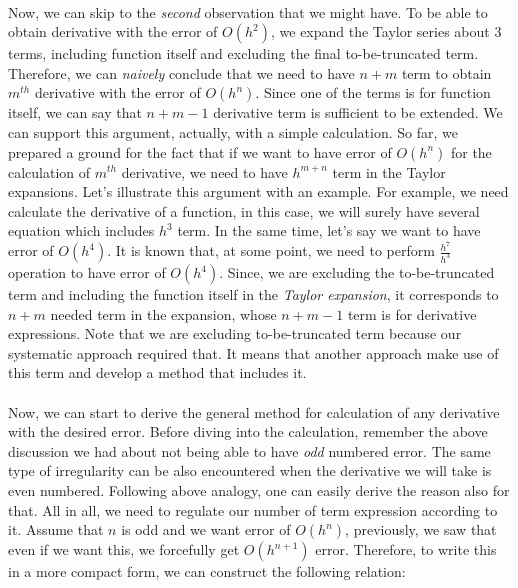 \documentclass[letterpaper,12pt]{article}
\begin{document}
\paragraph{} Now, we can skip to the \textit{second} observation that we might have. To be able to obtain  derivative with the error of $O(h^2)$, we expand the Taylor series about $3$ terms, including function itself and excluding the final to-be-truncated term. Therefore, we can \textit{naively} conclude that we need to have $n+m$ term to obtain $m^{th}$ derivative with the error of $O(h^n)$. Since one of the terms is for function itself, we can say that $n+m-1$ derivative term is sufficient to be extended. We can support this argument, actually, with a simple calculation. So far, we prepared a ground for the fact that if we want to have error of $O(h^n)$ for the calculation of $m^{th}$ derivative, we need to have $h^{m+n}$ term in the Taylor expansions. Let's illustrate this argument with an example. For example, we need calculate the  derivative of a function, in this case, we will surely have several equation which includes $h^3$ term. In the same time, let's say we want to have error of $O(h^4)$. It is known that, at some point, we need to perform $\frac{h^7}{h^3}$ operation to have error of $O(h^4)$. Since, we are excluding the to-be-truncated term and including the function itself in the \textit{Taylor expansion}, it corresponds to $n+m$ needed term in the expansion, whose $n+m-1$ term is for derivative expressions. Note that we are excluding to-be-truncated term because our systematic approach required that. It means that another approach make use of this term and develop a method that includes it.

\paragraph{}Now, we can start to derive the general method for calculation of any derivative with the desired error. Before diving into the calculation, remember the above discussion we had about not being able to have \textit{odd} numbered error. The same type of irregularity can be also encountered when the derivative we will take is even numbered. Following above analogy, one can easily derive the reason also for that. All in all, we need to regulate our number of term expression according to it. Assume that $n$ is odd and we want error of $O(h^n)$, previously, we saw that even if we want this, we forcefully get $O(h^{n+1})$ error. Therefore, to write this in a more compact form, we can construct the following relation:
\end{document}
